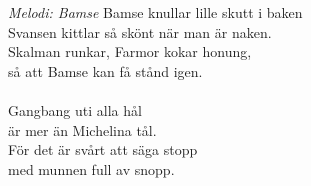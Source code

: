 {\footnotesize\textit{Melodi: Bamse}}
\vspace{10pt}
Bamse knullar lille skutt i baken\\
Svansen kittlar så skönt när man är naken.\\
Skalman runkar, Farmor kokar honung,\\
så att Bamse kan få stånd igen.\\
\\
Gangbang uti alla hål\\
är mer än Michelina tål.\\
För det är svårt att säga stopp\\
med munnen full av snopp.
